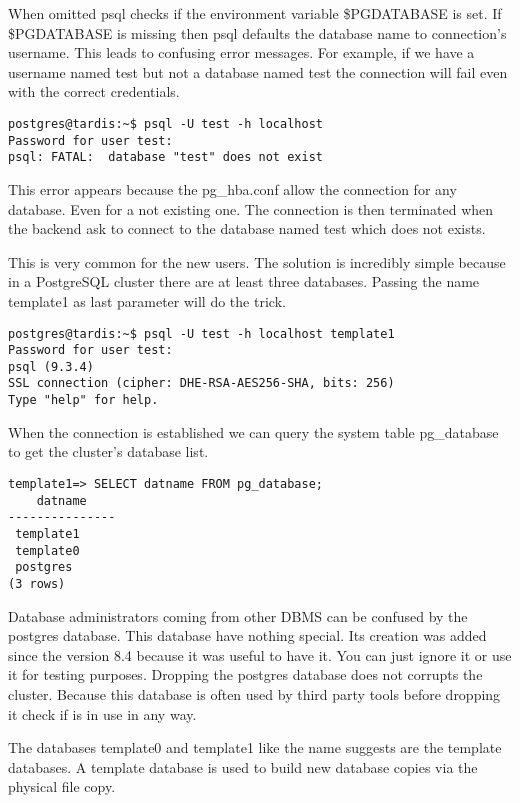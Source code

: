 When omitted psql checks if the environment variable \$PGDATABASE  is
set. If \$PGDATABASE is missing then psql defaults the database name to connection's username. This
leads to confusing error messages. For example, if we have a username named test but not a database
named test the connection will fail even with the correct credentials.

\begin{verbatim}
postgres@tardis:~$ psql -U test -h localhost
Password for user test:
psql: FATAL:  database "test" does not exist
\end{verbatim}

This error appears because the pg\_hba.conf allow the connection for any database. Even for a not
existing one. The connection is then terminated when the backend ask to connect to the database
named test which does not exists.\newline

This is very common for the new users. The solution is incredibly simple because in a PostgreSQL
cluster there are at least three databases. Passing the name template1 as last parameter will do
the trick.

\begin{verbatim}
postgres@tardis:~$ psql -U test -h localhost template1
Password for user test:
psql (9.3.4)
SSL connection (cipher: DHE-RSA-AES256-SHA, bits: 256)
Type "help" for help.
\end{verbatim}

When the connection is established we can query the system table pg\_database to get the
cluster's database list.

\begin{lstlisting}[style=pgsql]
template1=> SELECT datname FROM pg_database;
    datname
---------------
 template1
 template0
 postgres
(3 rows)

\end{lstlisting}

Database administrators coming from other DBMS can be confused by the postgres database.
This database have nothing special. Its creation was added since the version 8.4 because it was
useful to have it. You can just ignore it or use it for testing purposes. Dropping the postgres
database does not corrupts the cluster. Because this database is often used by third party
tools before dropping it check if is in use in any way.\newline

The databases template0 and template1   like the name suggests are the template databases. A template database  is used to build new database copies via the physical file copy.


